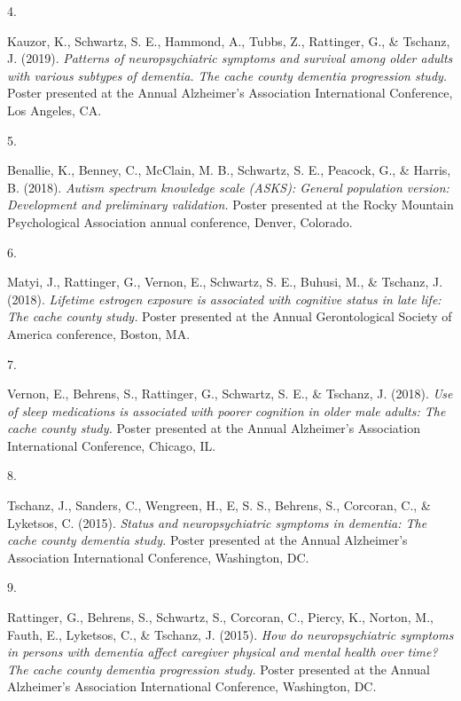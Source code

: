 \documentclass[11pt,a4paper,]{moderncv}
\newlength{\csllabelwidth}
\newcommand{\CSLLeftMargin}[1]{\parbox[t]{\csllabelwidth}{#1}}
\newcommand{\CSLRightInline}[1]{\parbox[t]{\linewidth - \csllabelwidth}{#1}}
\begin{document}
\leavevmode\hypertarget{ref-Kauzor2019poster}{}%
\CSLLeftMargin{4. }
\CSLRightInline{Kauzor, K., Schwartz, S. E., Hammond, A., Tubbs, Z.,
Rattinger, G., \& Tschanz, J. (2019). \emph{Patterns of neuropsychiatric
symptoms and survival among older adults with various subtypes of
dementia. The cache county dementia progression study.} Poster presented
at the Annual Alzheimer's Association International Conference, Los
Angeles, CA.}

\leavevmode\hypertarget{ref-benallie2018poster}{}%
\CSLLeftMargin{5. }
\CSLRightInline{Benallie, K., Benney, C., McClain, M. B., Schwartz, S.
E., Peacock, G., \& Harris, B. (2018). \emph{Autism spectrum knowledge
scale (ASKS): General population version: Development and preliminary
validation.} Poster presented at the Rocky Mountain Psychological
Association annual conference, Denver, Colorado.}

\leavevmode\hypertarget{ref-Matyi2018poster}{}%
\CSLLeftMargin{6. }
\CSLRightInline{Matyi, J., Rattinger, G., Vernon, E., Schwartz, S. E.,
Buhusi, M., \& Tschanz, J. (2018). \emph{Lifetime estrogen exposure is
associated with cognitive status in late life: The cache county study.}
Poster presented at the Annual Gerontological Society of America
conference, Boston, MA.}

\leavevmode\hypertarget{ref-vernon2018poster}{}%
\CSLLeftMargin{7. }
\CSLRightInline{Vernon, E., Behrens, S., Rattinger, G., Schwartz, S. E.,
\& Tschanz, J. (2018). \emph{Use of sleep medications is associated with
poorer cognition in older male adults: The cache county study.} Poster
presented at the Annual Alzheimer's Association International
Conference, Chicago, IL.}

\leavevmode\hypertarget{ref-joann2015poster}{}%
\CSLLeftMargin{8. }
\CSLRightInline{Tschanz, J., Sanders, C., Wengreen, H., E, S. S.,
Behrens, S., Corcoran, C., \& Lyketsos, C. (2015). \emph{Status and
neuropsychiatric symptoms in dementia: The cache county dementia study.}
Poster presented at the Annual Alzheimer's Association International
Conference, Washington, DC.}

\leavevmode\hypertarget{ref-rattinger2015poster}{}%
\CSLLeftMargin{9. }
\CSLRightInline{Rattinger, G., Behrens, S., Schwartz, S., Corcoran, C.,
Piercy, K., Norton, M., Fauth, E., Lyketsos, C., \& Tschanz, J. (2015).
\emph{How do neuropsychiatric symptoms in persons with dementia affect
caregiver physical and mental health over time? The cache county
dementia progression study.} Poster presented at the Annual Alzheimer's
Association International Conference, Washington, DC.}
\end{document}
